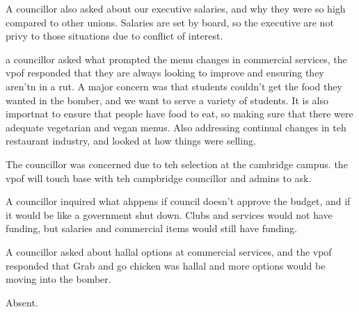 \begin{information}
    A councillor also asked about our executive salaries, and why they were
    so high compared to other unions. Salaries are set by board, so the 
    executive are not privy to those situations due to conflict of interest. 

    a councillor asked what prompted the menu changes in commercial services,
    the vpof responded that they are always looking to improve and ensuring 
    they aren'tn in a rut. A major concern was that students couldn't get
    the food they wanted in the bomber, and we want to serve a variety of 
    students. It is also importnat to ensure that people have food to eat, 
    so making sure that there were adequate vegetarian and vegan menus. 
    Also addressing continual changes in teh restaurant industry, and 
    looked at how things were selling. 

    The councillor was concerned due to teh selection at the cambridge campus.
    the vpof will touch base with teh campbridge councillor and admins to
    ask. 

    A councillor inquired what ahppens if council doesn't approve the budget,
    and if it would be like a government shut down. Clubs and services would 
    not have funding, but salaries and commercial items would still have 
    funding. 
    
    A councillor asked about hallal options at commercial services, and the vpof
    responded that Grab and go chicken was hallal and more options would be
    moving into the bomber. 

\end{information}

\begin{information}

    Absent. 


\end{information}




